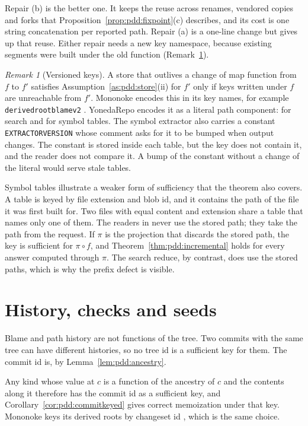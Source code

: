 \documentclass[11pt,letterpaper]{article}
\theoremstyle{definition}
\theoremstyle{remark}
\newtheorem{remark}[theorem]{Remark}
\DeclareRobustCommand{\code}[1]{{\def\_{\textunderscore\allowbreak}\texttt{#1}}}
\begin{document}
Repair (b) is the better one. It keeps the reuse across renames, vendored copies and forks that Proposition~\ref{prop:pdd:fixpoint}(c) describes, and its cost is one string concatenation per reported path. Repair (a) is a one-line change but gives up that reuse. Either repair needs a new key namespace, because existing segments were built under the old function (Remark~\ref{rem:pdd:versions}).

\begin{remark}[Versioned keys]
\label{rem:pdd:versions}
A store that outlives a change of map function from $f$ to $f'$ satisfies Assumption~\ref{as:pdd:store}(ii) for $f'$ only if keys written under $f$ are unreachable from $f'$. Mononoke encodes this in its key names, for example \code{derived\_root\_blame\_v2} \cite{mononokederived}. YonedaRepo encodes it as a literal path component:  for search and  for symbol tables. The symbol extractor also carries a constant \code{EXTRACTOR\_VERSION} whose comment asks for it to be bumped when output changes. The constant is stored inside each table, but the key does not contain it, and the reader does not compare it. A bump of the constant without a change of the literal would serve stale tables.
\end{remark}

Symbol tables illustrate a weaker form of sufficiency that the theorem also covers. A table is keyed by file extension and blob id, and it contains the path of the file it was first built for. Two files with equal content and extension share a table that names only one of them. The readers in  never use the stored path; they take the path from the request. If $\pi$ is the projection that discards the stored path, the key is sufficient for $\pi\circ f$, and Theorem~\ref{thm:pdd:incremental} holds for every answer computed through $\pi$. The search reduce, by contrast, does use the stored paths, which is why the prefix defect is visible.

\section{History, checks and seeds}
\label{sec:pdd:history}

Blame and path history are not functions of the tree. Two commits with the same tree can have different histories, so no tree id is a sufficient key for them. The commit id is, by Lemma~\ref{lem:pdd:ancestry}.

Any kind whose value at $c$ is a function of the ancestry of $c$ and the contents along it therefore has the commit id as a sufficient key, and Corollary~\ref{cor:pdd:commitkeyed} gives correct memoization under that key. Mononoke keys its derived roots by changeset id \cite{mononokederived}, which is the same choice.
\end{document}
